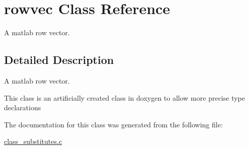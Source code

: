 \hypertarget{classrowvec}{\section{rowvec Class Reference}
\label{classrowvec}
}


A matlab row vector.  




\subsection{Detailed Description}
A matlab row vector. 

This class is an artificially created class in doxygen to allow more precise type declarations 

The documentation for this class was generated from the following file\-:\begin{DoxyCompactItemize}
\item 
\hyperlink{class__substitutes_8c}{class\-\_\-substitutes.\-c}\end{DoxyCompactItemize}
